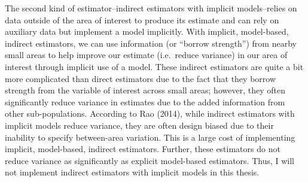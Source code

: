 \documentclass[12pt,twoside]{reedthesis}
\begin{document}
The second kind of estimator--indirect estimators with implicit models--relies on data outside of the area of interest to produce its estimate and can rely on auxiliary data but implement a model implicitly. With implicit, model-based, indirect estimators, we can use information (or ``borrow strength'') from nearby small areas to help improve our estimate (i.e.~reduce variance) in our area of interest through implicit use of a model. These indirect estimators are quite a bit more complicated than direct estimators due to the fact that they borrow strength from the variable of interest across small areas; however, they often significantly reduce variance in estimates due to the added information from other sub-populations. According to Rao (2014), while indirect estimators with implicit models reduce variance, they are often design biased due to their inability to specify between-area variation. This is a large cost of implementing implicit, model-based, indirect estimators. Further, these estimators do not reduce variance as significantly as explicit model-based estimators. Thus, I will not implement indirect estimators with implicit models in this thesis.
\end{document}
